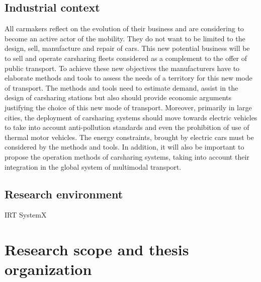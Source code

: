 \begin{bibunit}[ieeetr]
\subsection{Industrial context}
All carmakers reflect on the evolution of their business and are considering to become an active actor of the mobility. 
They do not want to be limited to the design, sell, manufacture and repair of cars.
This new potential business will be to sell and operate carsharing fleets considered as a complement to the offer of public transport.
To achieve these new objectives the manufacturers have to elaborate methods and tools to assess the needs of a territory for this new mode of transport.
The methods and tools need to estimate demand, assist in the design of carsharing stations but also should provide economic arguments justifying the choice of this new mode of transport.
Moreover, primarily in large cities, the deployment of carsharing systems should move towards electric vehicles to take into account anti-pollution standards and even the prohibition of use of thermal motor vehicles.
The energy constraints, brought by electric cars must be considered by the methods and tools.
In addition, it will also be important to propose the operation methods of carsharing systems, taking into account their integration in the global system of multimodal transport.

\subsection{Research environment}
IRT SystemX

\section{Research scope and thesis organization}







\newpage
{}
\renewcommand{\bibname}{Bibliography of chapter \thechapter}
\end{bibunit}
